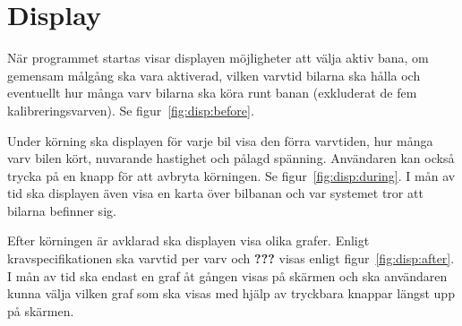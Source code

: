 \section{Display}

När programmet startas visar displayen möjligheter att välja aktiv bana, om
gemensam målgång ska vara aktiverad, vilken varvtid bilarna ska hålla och
eventuellt hur många varv bilarna ska köra runt banan (exkluderat de fem
kalibreringsvarven). Se figur~\ref{fig:disp:before}.

Under körning ska displayen för varje bil visa den förra varvtiden, hur många
varv bilen kört, nuvarande hastighet och pålagd spänning. Användaren kan också
trycka på en knapp för att avbryta körningen. Se figur~\ref{fig:disp:during}. I
mån av tid ska displayen även visa en karta över bilbanan och var systemet tror
att bilarna befinner sig.

Efter körningen är avklarad ska displayen visa olika grafer. Enligt
kravspecifikationen ska varvtid per varv och \textbf{???} visas enligt
figur~\ref{fig:disp:after}. I mån av tid ska endast en graf åt gången visas på
skärmen och ska användaren kunna välja vilken graf som ska visas med hjälp av
tryckbara knappar längst upp på skärmen.

